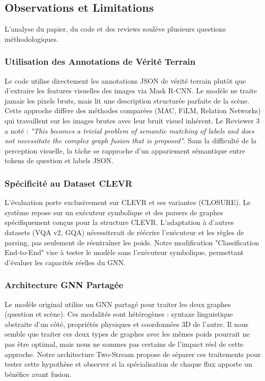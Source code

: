 \documentclass[a4paper,11pt]{article}
\begin{document}
\subsection{Observations et Limitations}
L'analyse du papier, du code et des reviews soulève plusieurs questions méthodologiques.

\subsubsection{Utilisation des Annotations de Vérité Terrain}
Le code utilise directement les annotations JSON de vérité terrain plutôt que d'extraire les features visuelles des images via Mask R-CNN. Le modèle ne traite jamais les pixels bruts, mais lit une description structurée parfaite de la scène. Cette approche diffère des méthodes comparées (MAC, FiLM, Relation Networks) qui travaillent sur les images brutes avec leur bruit visuel inhérent. Le Reviewer 3 a noté : \textit{"This becomes a trivial problem of semantic matching of labels and does not necessitate the complex graph fusion that is proposed"}. Sans la difficulté de la perception visuelle, la tâche se rapproche d'un appariement sémantique entre tokens de question et labels JSON.

\subsubsection{Spécificité au Dataset CLEVR}
L'évaluation porte exclusivement sur CLEVR et ses variantes (CLOSURE). Le système repose sur un exécuteur symbolique et des parsers de graphes spécifiquement conçus pour la structure CLEVR. L'adaptation à d'autres datasets (VQA v2, GQA) nécessiterait de réécrire l'exécuteur et les règles de parsing, pas seulement de réentraîner les poids. Notre modification "Classification End-to-End" vise à tester le modèle sans l'exécuteur symbolique, permettant d'évaluer les capacités réelles du GNN.

\subsubsection{Architecture GNN Partagée}
Le modèle original utilise un GNN partagé pour traiter les deux graphes (question et scène). Ces modalités sont hétérogènes : syntaxe linguistique abstraite d'un côté, propriétés physiques et coordonnées 3D de l'autre. Il nous semble que traiter ces deux types de graphes avec les mêmes poids pourrait ne pas être optimal, mais nous ne sommes pas certains de l'impact réel de cette approche. Notre architecture Two-Stream propose de séparer ces traitements pour tester cette hypothèse et observer si la spécialisation de chaque flux apporte un bénéfice avant fusion.
\end{document}
